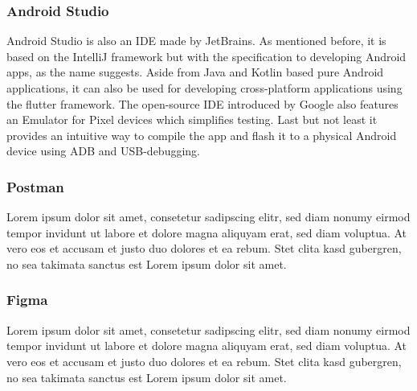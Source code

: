 \subsubsection{Android Studio}
Android Studio is also an IDE made by JetBrains. As mentioned before, it is based on the IntelliJ framework but with the specification to developing Android apps, as the name suggests. Aside from Java and Kotlin based pure Android applications, it can also be used for developing cross-platform applications using the flutter framework. The open-source IDE introduced by Google also features an Emulator for Pixel devices which simplifies testing. Last but not least it provides an intuitive way to compile the app and flash it to a physical Android device using ADB and USB-debugging. 
\subsubsection{Postman}
Lorem ipsum dolor sit amet, consetetur sadipscing elitr, sed diam nonumy eirmod tempor invidunt ut labore et dolore magna aliquyam erat, sed diam voluptua. At vero eos et accusam et justo duo dolores et ea rebum. Stet clita kasd gubergren, no sea takimata sanctus est Lorem ipsum dolor sit amet.

\subsubsection{Figma}
Lorem ipsum dolor sit amet, consetetur sadipscing elitr, sed diam nonumy eirmod tempor invidunt ut labore et dolore magna aliquyam erat, sed diam voluptua. At vero eos et accusam et justo duo dolores et ea rebum. Stet clita kasd gubergren, no sea takimata sanctus est Lorem ipsum dolor sit amet.

